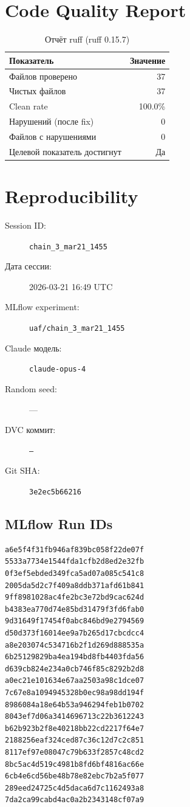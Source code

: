 \documentclass[12pt,a4paper]{article}
\begin{document}
\section{Code Quality Report}

\begin{table}[H]
\centering
\caption{Отчёт ruff (ruff 0.15.7)}
\begin{tabular}{lr}
\toprule
Показатель & Значение \\
\midrule
Файлов проверено & 37 \\
Чистых файлов & 37 \\
Clean rate & \textcolor{passcolor}{100.0\%} \\
Нарушений (после fix) & \textcolor{passcolor}{0} \\
Файлов с нарушениями & 0 \\
Целевой показатель достигнут & \textcolor{passcolor}{Да} \\
\bottomrule
\end{tabular}
\end{table}





\section{Reproducibility}

\begin{description}
    \item[Session ID:] \texttt{chain\_3\_mar21\_1455}
    \item[Дата сессии:] 2026-03-21 16:49 UTC
    \item[MLflow experiment:] \texttt{uaf/chain\_3\_mar21\_1455}
    \item[Claude модель:] \texttt{claude-opus-4}
    \item[Random seed:] ---
    \item[DVC коммит:] \texttt{---}
    \item[Git SHA:] \texttt{3e2ec5b66216}
\end{description}

\subsection*{MLflow Run IDs}

\begin{lstlisting}
a6e5f4f31fb946af839bc058f22de07f
5533a7734e1544fda1cfb2d8ed2e32fb
0f3ef5ebded349fca5ad07a085c541c8
2005da5d2c7f409a8ddb371afd61b841
9ff8981028ac4fe2bc3e72bd9cac624d
b4383ea770d74e85bd31479f3fd6fab0
9d31649f17454f0abc846bd9e2794569
d50d373f16014ee9a7b265d17cbcdcc4
a8e203074c534716b2f1d269d888535a
6b25129829ba4ea194bd8fb4403fda56
d639cb824e234a0cb746f85c8292b2d8
a0ec21e101634e67aa2503a98c1dce07
7c67e8a1094945328b0ec98a98dd194f
8986084a18e64b53a946294feb1b0702
8043ef7d06a3414696713c22b3612243
b62b923b2f8e40218bb22cd2217f64e7
2188256eaf324ced87c36c12d7c2c851
8117ef97e08047c79b633f2857c48cd2
8bc5ac4d519c4981b8fd6bf4816ac66e
6cb4e6cd56be48b78e82ebc7b2a5f077
289eed24725c4d5daca6d7c1162493a8
7da2ca99cabd4ac0a2b2343148cf07a9
\end{lstlisting}
\end{document}
